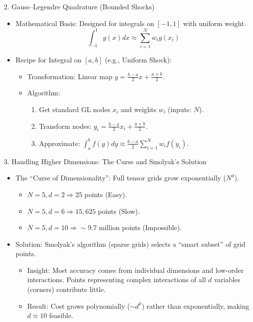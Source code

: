 \documentclass[aspectratio=169]{beamer}
\newcommand{\1}{\mathbf{1}}
\begin{document}
\begin{frame}{2. Gauss--Legendre Quadrature (Bounded Shocks)}
\small
\begin{itemize}\setlength{\itemsep}{1.5mm}
    \item Mathematical Basis: Designed for integrals on $[-1, 1]$ with uniform weight.
    \[ \int_{-1}^{1} g(x) dx \approx \sum_{i=1}^N w_i g(x_i) \]
    \item Recipe for Integral on $[a, b]$ (e.g., Uniform Shock):
    \begin{itemize}\setlength{\itemsep}{1mm}
        \item Transformation: Linear map $y = \frac{b-a}{2}x + \frac{a+b}{2}$.
        \item Algorithm:
        \begin{enumerate}
            \item Get standard GL nodes $x_i$ and weights $w_i$ (inputs: $N$).
            \item Transform nodes: $y_i = \frac{b-a}{2}x_i + \frac{a+b}{2}$.
            \item Approximate: $\int_a^b f(y) dy \approx \frac{b-a}{2} \sum_{i=1}^N w_i f(y_i)$.
        \end{enumerate}
    \end{itemize}
\end{itemize}
\end{frame}

\begin{frame}{3. Handling Higher Dimensions: The Curse and Smolyak's Solution}
\small
\begin{itemize}\setlength{\itemsep}{1.5mm}
    \item The ``Curse of Dimensionality'': Full tensor grids grow exponentially ($N^d$).
    \begin{itemize}\setlength{\itemsep}{1mm}
        \item $N=5, d=2 \Rightarrow 25$ points (Easy).
        \item $N=5, d=6 \Rightarrow 15,625$ points (Slow).
        \item $N=5, d=10 \Rightarrow \sim 9.7 \text{ million}$ points (Impossible).
    \end{itemize}
    \item Solution: Smolyak's algorithm (sparse grids) selects a ``smart subset'' of grid points.
    \begin{itemize}\setlength{\itemsep}{1mm}
        \item Insight: Most accuracy comes from individual dimensions and low-order interactions. Points representing complex interactions of all $d$ variables (corners) contribute little.
        \item Result: Cost grows polynomially ($\sim d^k$) rather than exponentially, making $d \approx 10$ feasible.
    \end{itemize}
\end{itemize}
\end{frame}
\end{document}
